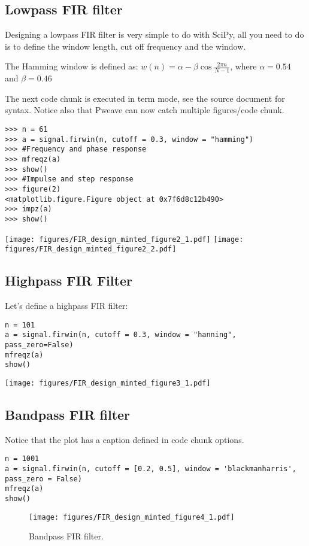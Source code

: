 \documentclass[a4paper,11pt,final]{article}
\begin{document}
\subsection{Lowpass FIR filter}

Designing a lowpass FIR filter is very simple to do with SciPy, all you
need to do is to define the window length, cut off frequency and the
window.

The Hamming window is defined as:
$w(n) = \alpha - \beta\cos\frac{2\pi n}{N-1}$, where $\alpha=0.54$ and
$\beta=0.46$

The next code chunk is executed in term mode, see the source document
for syntax. Notice also that Pweave can now catch multiple
figures/code chunk.


\begin{verbatim}
>>> n = 61
>>> a = signal.firwin(n, cutoff = 0.3, window = "hamming")
>>> #Frequency and phase response
>>> mfreqz(a)
>>> show()
>>> #Impulse and step response
>>> figure(2)
<matplotlib.figure.Figure object at 0x7f6d8c12b490>
>>> impz(a)
>>> show()

\end{verbatim}
\texttt{[image: figures/FIR\_design\_minted\_figure2\_1.pdf]}
\texttt{[image: figures/FIR\_design\_minted\_figure2\_2.pdf]}


\subsection{Highpass FIR Filter}

Let's define a highpass FIR filter:


\begin{verbatim}
n = 101
a = signal.firwin(n, cutoff = 0.3, window = "hanning",
pass_zero=False)
mfreqz(a)
show()
\end{verbatim}
\texttt{[image: figures/FIR\_design\_minted\_figure3\_1.pdf]}


\subsection{Bandpass FIR filter}

Notice that the plot has a caption defined in code chunk options.



\begin{verbatim}
n = 1001
a = signal.firwin(n, cutoff = [0.2, 0.5], window = 'blackmanharris',
pass_zero = False)
mfreqz(a)
show()
\end{verbatim}
\begin{figure}[htpb]
\center
\texttt{[image: figures/FIR\_design\_minted\_figure4\_1.pdf]}
\caption{Bandpass FIR filter.}
\label{fig:None}
\end{figure}
\end{document}
